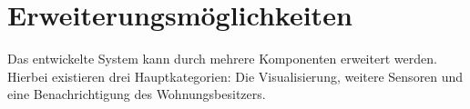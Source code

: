 \section{Erweiterungsm\"oglichkeiten}\label{s:Erweiterungsmoeglichkeiten}

Das entwickelte System kann durch mehrere Komponenten erweitert werden. Hierbei existieren drei Hauptkategorien: Die Visualisierung, weitere Sensoren und eine Benachrichtigung des Wohnungsbesitzers.



